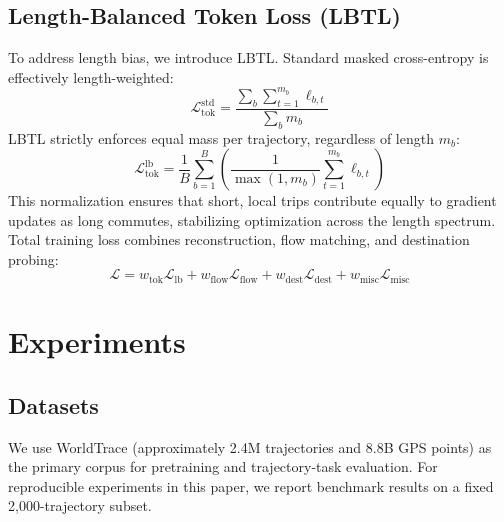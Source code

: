 \documentclass{article}
\begin{document}
\subsection{Length-Balanced Token Loss (LBTL)}
To address length bias, we introduce LBTL. Standard masked cross-entropy is effectively length-weighted:
\begin{equation}
\mathcal{L}^{\text{std}}_{\text{tok}}=\frac{\sum_b\sum_{t=1}^{m_b}\ell_{b,t}}{\sum_b m_b}
\end{equation}
LBTL strictly enforces equal mass per trajectory, regardless of length $m_b$:
\begin{equation}
\mathcal{L}^{\text{lb}}_{\text{tok}}=\frac{1}{B}\sum_{b=1}^{B}\left(\frac{1}{\max(1,m_b)}\sum_{t=1}^{m_b}\ell_{b,t}\right)
\end{equation}
This normalization ensures that short, local trips contribute equally to gradient updates as long commutes, stabilizing optimization across the length spectrum.
Total training loss combines reconstruction, flow matching, and destination probing:
\begin{equation}
\mathcal{L} = w_{\text{tok}}\mathcal{L}_{\text{lb}} + w_{\text{flow}}\mathcal{L}_{\text{flow}} + w_{\text{dest}}\mathcal{L}_{\text{dest}} + w_{\text{misc}}\mathcal{L}_{\text{misc}}
\end{equation}

\section{Experiments}
\subsection{Datasets}


We use WorldTrace (approximately 2.4M trajectories and 8.8B GPS points) as the primary corpus for pretraining and trajectory-task evaluation. For reproducible experiments in this paper, we report benchmark results on a fixed 2,000-trajectory subset.
\end{document}
